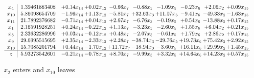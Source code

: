 \documentclass[9pt]{article}
\begin{document}
 \[\begin{array}{c| c c@{\hskip 2pt} c@{\hskip 2pt} c@{\hskip 2pt} c@{\hskip 2pt} c@{\hskip 2pt} c@{\hskip 2pt} c@{\hskip 2pt} c@{\hskip 2pt} }
 x_{4}   &  1.39461883408 & +  0.14 x_{14} & +  0.02 x_{12} & -0.66 x_{7} & -0.88 x_{3} & -1.09 x_{5} & -0.23 x_{6} & +  2.06 x_{2} & +  0.09 x_{15}\\
 x_{10}   &  5.86098654709 & -1.96 x_{14} & +  1.13 x_{12} & -5.81 x_{7} & + 32.63 x_{3} & + 11.07 x_{5} & -9.41 x_{6} & -49.33 x_{2} & -1.63 x_{15}\\
 x_{11}   &  21.7892376682 & -0.71 x_{14} & +  0.04 x_{12} & +  2.67 x_{7} & -6.76 x_{3} & -0.19 x_{5} & +  0.54 x_{6} & -13.88 x_{2} & +  0.17 x_{15}\\
 x_{1}   &  2.16591928251 & +  0.24 x_{14} & -0.22 x_{12} & +  1.13 x_{7} & -3.23 x_{3} & -2.60 x_{5} & +  1.55 x_{6} & +  6.04 x_{2} & +  0.21 x_{15}\\
 x_{8}   &  2.33632286996 & +  0.03 x_{14} & -0.12 x_{12} & +  0.48 x_{7} & -2.07 x_{3} & -0.61 x_{5} & +  1.79 x_{6} & +  2.86 x_{2} & +  0.17 x_{15}\\
 x_{9}   &  29.6995515695 & +  2.35 x_{14} & -2.33 x_{12} & +  2.28 x_{7} & -38.74 x_{3} & -29.76 x_{5} & + 19.73 x_{6} & + 75.42 x_{2} & +  2.92 x_{15}\\
 x_{13}   &  15.7085201794 & +  0.44 x_{14} & -1.70 x_{12} & + 11.72 x_{7} & -18.94 x_{3} & -3.60 x_{5} & + 16.11 x_{6} & + 29.99 x_{2} & +  1.45 x_{15}\\
\hline
z    &  5.93273542601 & -0.21 x_{14} & -0.78 x_{12} & +  8.70 x_{7} & -9.99 x_{3} & +  3.32 x_{5} & + 14.64 x_{6} & + 14.23 x_{2} & +  0.57 x_{15}\\
\end{array}\]


 $ x_{2} $ enters and $ x_{10} $ leaves 
\end{document}
